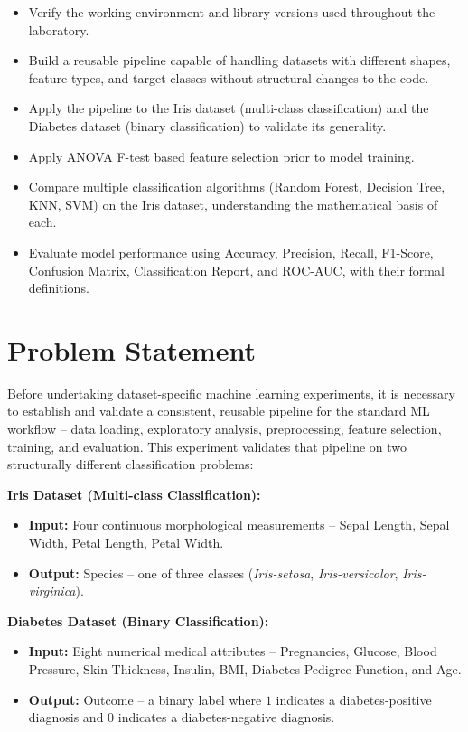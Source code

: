 \documentclass[12pt,a4paper]{article}
\begin{document}
\begin{itemize}
\item Verify the working environment and library versions used throughout the laboratory.
\item Build a reusable pipeline capable of handling datasets with different shapes, feature types, and target classes without structural changes to the code.
\item Apply the pipeline to the Iris dataset (multi-class classification) and the Diabetes dataset (binary classification) to validate its generality.
\item Apply ANOVA F-test based feature selection prior to model training.
\item Compare multiple classification algorithms (Random Forest, Decision Tree, KNN, SVM) on the Iris dataset, understanding the mathematical basis of each.
\item Evaluate model performance using Accuracy, Precision, Recall, F1-Score, Confusion Matrix, Classification Report, and ROC-AUC, with their formal definitions.
\end{itemize}

\section{Problem Statement}

Before undertaking dataset-specific machine learning experiments, it is necessary to establish and validate a consistent, reusable pipeline for the standard ML workflow -- data loading, exploratory analysis, preprocessing, feature selection, training, and evaluation. This experiment validates that pipeline on two structurally different classification problems:

\textbf{Iris Dataset (Multi-class Classification):}
\begin{itemize}
\item \textbf{Input:} Four continuous morphological measurements -- Sepal Length, Sepal Width, Petal Length, Petal Width.
\item \textbf{Output:} Species -- one of three classes (\textit{Iris-setosa}, \textit{Iris-versicolor}, \textit{Iris-virginica}).
\end{itemize}

\textbf{Diabetes Dataset (Binary Classification):}
\begin{itemize}
\item \textbf{Input:} Eight numerical medical attributes -- Pregnancies, Glucose, Blood Pressure, Skin Thickness, Insulin, BMI, Diabetes Pedigree Function, and Age.
\item \textbf{Output:} Outcome -- a binary label where $1$ indicates a diabetes-positive diagnosis and $0$ indicates a diabetes-negative diagnosis.
\end{itemize}
\end{document}
